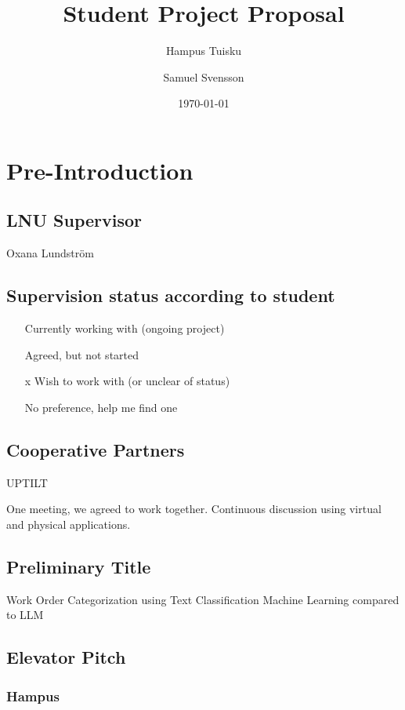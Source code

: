 \documentclass{article}
\title{Student Project Proposal}
\author{Hampus Tuisku \and Samuel Svensson}
\date{\today}
\begin{document}
\maketitle

\section{Pre-Introduction}

\subsection{LNU Supervisor}
Oxana Lundström

\subsection{Supervision status according to student}

\begin{itemize}
      \item [ ] Currently working with (ongoing project)
      \item [ ] Agreed, but not started
      \item [x] Wish to work with (or unclear of status)
      \item [ ] No preference, help me find one
\end{itemize}

\subsection{Cooperative Partners}

UPTILT

One meeting, we agreed to work together.
Continuous discussion using virtual and physical applications.

\subsection{Preliminary Title}

Work Order Categorization using Text Classification Machine Learning compared to LLM

\subsection{Elevator Pitch}

\subsubsection{Hampus}
\end{document}
